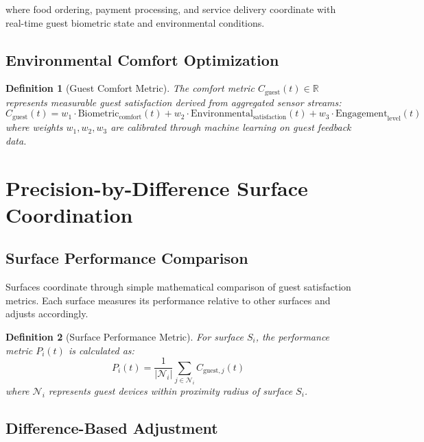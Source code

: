 \documentclass[12pt,a4paper]{article}
\newtheorem{definition}{Definition}
\begin{document}
where food ordering, payment processing, and service delivery coordinate with real-time guest biometric state and environmental conditions.

\subsection{Environmental Comfort Optimization}

\begin{definition}[Guest Comfort Metric]
The comfort metric $C_{\text{guest}}(t) \in \mathbb{R}$ represents measurable guest satisfaction derived from aggregated sensor streams:
\begin{equation}
C_{\text{guest}}(t) = w_1 \cdot \text{Biometric}_{\text{comfort}}(t) + w_2 \cdot \text{Environmental}_{\text{satisfaction}}(t) + w_3 \cdot \text{Engagement}_{\text{level}}(t)
\end{equation}
where weights $w_1, w_2, w_3$ are calibrated through machine learning on guest feedback data.
\end{definition}

\section{Precision-by-Difference Surface Coordination}

\subsection{Surface Performance Comparison}

Surfaces coordinate through simple mathematical comparison of guest satisfaction metrics. Each surface measures its performance relative to other surfaces and adjusts accordingly.

\begin{definition}[Surface Performance Metric]
For surface $S_i$, the performance metric $P_i(t)$ is calculated as:
\begin{equation}
P_i(t) = \frac{1}{|\mathcal{N}_i|} \sum_{j \in \mathcal{N}_i} C_{\text{guest},j}(t)
\end{equation}
where $\mathcal{N}_i$ represents guest devices within proximity radius of surface $S_i$.
\end{definition}

\subsection{Difference-Based Adjustment}
\end{document}
